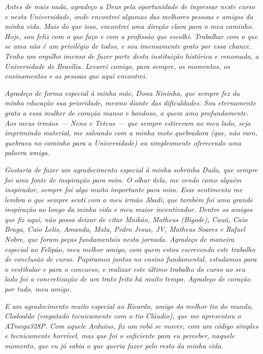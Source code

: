 \begin{agradecimentos}
\textit{Antes de mais nada, agradeço a Deus pela oportunidade de ingressar neste curso e nesta 
Universidade, onde encontrei algumas das melhores pessoas e amigos da minha vida. Mais do 
que isso, encontrei uma direção clara para o meu caminho. Hoje, sou feliz com o que faço e com 
a profissão que escolhi. Trabalhar com o que se ama não é um privilégio de todos, e sou 
imensamente grato por essa chance. Tenho um orgulho imenso de fazer parte desta instituição 
histórica e renomada, a Universidade de Brasília. Levarei comigo, para sempre, os momentos, 
os ensinamentos e as pessoas que aqui encontrei.}

\textit{Agradeço de forma especial à minha mãe, Dona Nininha, que sempre fez da minha educação 
sua prioridade, mesmo diante das dificuldades. Sou eternamente grato a essa mulher de coração 
manso e bondoso, a quem amo profundamente. Aos meus irmãos —  Neno e Teteus — que 
sempre estiveram ao meu lado, seja imprimindo material, me salvando com a minha moto 
quebradora (que, não raro, quebrava no caminho para a Universidade) ou simplesmente 
oferecendo uma palavra amiga.}

\textit{Gostaria de fazer um agradecimento especial à minha sobrinha Duda, que sempre foi uma fonte 
de inspiração para mim. O olhar dela, me vendo como alguém inspirador, sempre foi algo muito 
importante para mim. Esse sentimento me lembra o que sempre senti com o meu irmão Abadi, 
que também foi uma grande inspiração ao longo da minha vida e meu maior incentivador. 
Dentre os amigos que fiz aqui, não posso deixar de citar Maikão, Matheus (Bigode), Cauã, Caio 
Braga, Caio Lelis, Amanda, Malu, Pedro Jesus, JV, Matheus Soares e Rafael Nobre, que foram 
peças fundamentais nesta jornada. Agradeço de maneira especial ao Felipão, meu melhor 
amigo, com quem estou escrevendo este trabalho de conclusão de curso. Papiramos juntos no 
ensino fundamental, estudamos para o vestibular e para o concurso, e realizar este último 
trabalho do curso ao seu lado foi a concretização de um trato feito há muito tempo. Agradeço de 
coração por tudo, meu amigo.} 

\textit{E um agradecimento muito especial ao Ricardo, amigo do melhor tio do mundo, Clodoaldo 
(empatado tecnicamente com o tio Cláudio), que me apresentou o ATmega328P. Com aquele 
Arduino, fiz um robô se mover, com um código simples e tecnicamente horrível, mas que foi o 
suficiente para eu perceber, naquele momento, que eu já sabia o que queria fazer pelo resto da 
minha vida.}

\end{agradecimentos}
